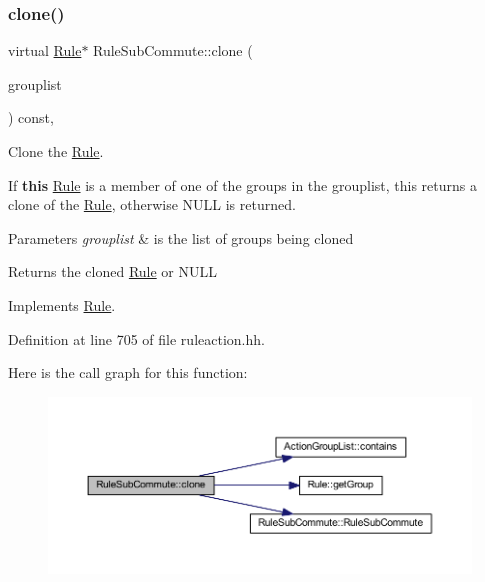 \subsubsection{\texorpdfstring{clone()}{clone()}}
{\footnotesize\ttfamily virtual \mbox{\hyperlink{class_rule}{Rule}}$\ast$ Rule\+Sub\+Commute\+::clone (\begin{DoxyParamCaption}\item[{const \mbox{\hyperlink{class_action_group_list}{Action\+Group\+List}} \&}]{grouplist }\end{DoxyParamCaption}) const\hspace{0.3cm}{\ttfamily [inline]}, {\ttfamily [virtual]}}



Clone the \mbox{\hyperlink{class_rule}{Rule}}. 

If {\bfseries{this}} \mbox{\hyperlink{class_rule}{Rule}} is a member of one of the groups in the grouplist, this returns a clone of the \mbox{\hyperlink{class_rule}{Rule}}, otherwise N\+U\+LL is returned. 
\begin{DoxyParams}{Parameters}
{\em grouplist} & is the list of groups being cloned \\
\hline
\end{DoxyParams}
\begin{DoxyReturn}{Returns}
the cloned \mbox{\hyperlink{class_rule}{Rule}} or N\+U\+LL 
\end{DoxyReturn}


Implements \mbox{\hyperlink{class_rule_a70de90a76461bfa7ea0b575ce3c11e4d}{Rule}}.



Definition at line 705 of file ruleaction.\+hh.

Here is the call graph for this function\+:
\nopagebreak
\begin{figure}[H]
\begin{center}
\leavevmode
\includegraphics[width=350pt]{class_rule_sub_commute_a8f55fe42f0e9fe86ecf6ee4c152f5f7f_cgraph}
\end{center}
\end{figure}
\mbox{\label{class_rule_sub_commute_a4e7bf3fd94f49fcebed32fe2bac6b739}} 
